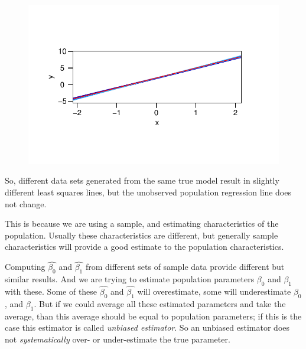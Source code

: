 \documentclass[
  letterpaper,
  DIV=11,
  numbers=noendperiod]{scrreprt}
\newenvironment{Shaded}{\begin{snugshade}}{\end{snugshade}}
\newcommand{\AttributeTok}[1]{\textcolor[rgb]{0.40,0.45,0.13}{#1}}
\newcommand{\DecValTok}[1]{\textcolor[rgb]{0.68,0.00,0.00}{#1}}
\newcommand{\FunctionTok}[1]{\textcolor[rgb]{0.28,0.35,0.67}{#1}}
\newcommand{\NormalTok}[1]{\textcolor[rgb]{0.00,0.23,0.31}{#1}}
\newcommand{\SpecialCharTok}[1]{\textcolor[rgb]{0.37,0.37,0.37}{#1}}
\newcommand{\StringTok}[1]{\textcolor[rgb]{0.13,0.47,0.30}{#1}}
\begin{document}
\begin{Shaded}
\end{Shaded}

\begin{figure}[H]

{\centering \includegraphics{Chapter3_files/figure-pdf/unnamed-chunk-19-1.pdf}

}

\end{figure}

So, different data sets generated from the same true model result in
slightly different least squares lines, but the unobserved population
regression line does not change.

This is because we are using a sample, and estimating characteristics of
the population. Usually these characteristics are different, but
generally sample characteristics will provide a good estimate to the
population characteristics.

Computing \(\hat{\beta_0}\) and \(\hat{\beta_1}\) from different sets of
sample data provide different but similar results. And we are trying to
estimate population parameters \(\beta_0\) and \(\beta_1\) with these.
Some of these \(\hat{\beta_0}\) and \(\hat{\beta_1}\) will overestimate,
some will underestimate \(\beta_0\), and \(\beta_1\). But if we could
average all these estimated parameters and take the average, than this
average should be equal to population parameters; if this is the case
this estimator is called \emph{unbiased estimator}. So an unbiased
estimator does not \emph{systematically} over- or under-estimate the
true parameter.
\end{document}
